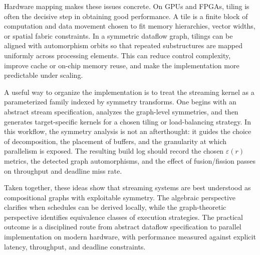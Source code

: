 Hardware mapping makes these issues concrete. On GPUs and FPGAs, tiling is often the decisive step in obtaining good performance. A tile is a finite block of computation and data movement chosen to fit memory hierarchies, vector widths, or spatial fabric constraints. In a symmetric dataflow graph, tilings can be aligned with automorphism orbits so that repeated substructures are mapped uniformly across processing elements. This can reduce control complexity, improve cache or on-chip memory reuse, and make the implementation more predictable under scaling.

A useful way to organize the implementation is to treat the streaming kernel as a parameterized family indexed by symmetry transforms. One begins with an abstract stream specification, analyzes the graph-level symmetries, and then generates target-specific kernels for a chosen tiling or load-balancing strategy. In this workflow, the symmetry analysis is not an afterthought: it guides the choice of decomposition, the placement of buffers, and the granularity at which parallelism is exposed. The resulting build log should record the chosen \(\varepsilon(r)\) metrics, the detected graph automorphisms, and the effect of fusion/fission passes on throughput and deadline miss rate.

Taken together, these ideas show that streaming systems are best understood as compositional graphs with exploitable symmetry. The algebraic perspective clarifies when schedules can be derived locally, while the graph-theoretic perspective identifies equivalence classes of execution strategies. The practical outcome is a disciplined route from abstract dataflow specification to parallel implementation on modern hardware, with performance measured against explicit latency, throughput, and deadline constraints.
